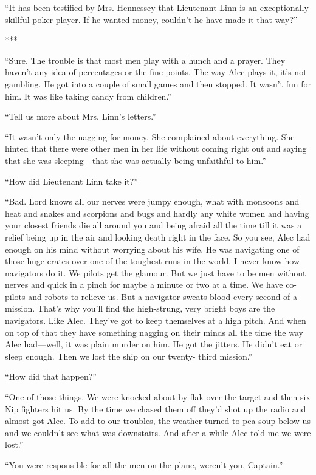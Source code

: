 \documentclass{novel}
\begin{document}
{“It has been testified by Mrs. Hennessey that Lieutenant Linn is an exceptionally skillful poker player. If he wanted money, couldn’t he have made it that way?”

***

“Sure. The trouble is that most men play with a hunch and a prayer. They haven’t any idea of percentages or the fine points. The way Alec plays it, it’s not gambling. He got into a couple of small games and then stopped. It wasn’t fun for him. It was like taking candy from children.”

“Tell us more about Mrs. Linn’s letters.”

“It wasn’t only the nagging for money. She complained about everything. She hinted that there were other men in her life without coming right out and saying that she was sleeping—that she was actually being unfaithful to him.”

“How did Lieutenant Linn take it?”

“Bad. Lord knows all our nerves were jumpy enough, what with monsoons and heat and snakes and scorpions and bugs and hardly any white women and having your closest friends die all around you and being afraid all the time till it was a relief being up in the air and looking death right in the face. So you see, Alec had enough on his mind without worrying about his wife. He was navigating one of those huge crates over one of the toughest runs in the world. I never know how navigators do it. We pilots get the glamour. But we just have to be men without nerves and quick in a pinch for maybe a minute or two at a time. We have co-pilots and robots to relieve us. But a navigator sweats blood every second of a mission. That’s why you’ll find the high-strung, very bright boys are the navigators. Like Alec. They’ve got to keep themselves at a high pitch. And when on top of that they have something nagging on their minds all the time the way Alec had—well, it was plain murder on him. He got the jitters. He didn’t eat or sleep enough. Then we lost the ship on our twenty- third mission.”

“How did that happen?”

“One of those things. We were knocked about by flak over the target and then six Nip fighters hit us. By the time we chased them off they’d shot up the radio and almost got Alec. To add to our troubles, the weather turned to pea soup below us and we couldn’t see what was downstairs. And after a while Alec told me we were lost.”

“You were responsible for all the men on the plane, weren’t you, Captain.”

}
\end{document}
